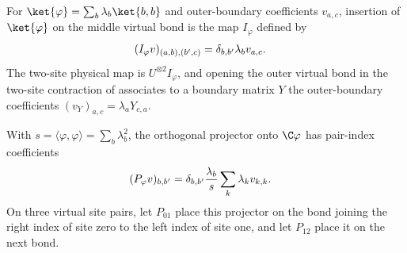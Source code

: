 \begin{definition}
    \label{def:appendixB_two_site_bond_embedding}
    \leanok
    For $\ket{\varphi}=\sum_b\lambda_b\ket{b,b}$ and outer-boundary
    coefficients $v_{a,c}$, insertion of $\ket{\varphi}$ on the middle virtual
    bond is the map $I_\varphi$ defined by
    \begin{align}
        (I_\varphi v)_{(a,b),(b',c)}
         & =
        \delta_{b,b'}\lambda_bv_{a,c}.
        \notag
    \end{align}
    The two-site physical map is $U^{\otimes2}I_\varphi$, and opening the outer
    virtual bond in the two-site contraction of
    \cite[Equations~(3.17)--(3.18)]{Cirac2016MPDO_arXiv} associates to a
    boundary matrix $Y$ the outer-boundary coefficients
    $(v_Y)_{a,c}=\lambda_aY_{c,a}$.
\end{definition}

\begin{definition}
    \label{def:appendixB_virtual_bond_projectors}
    \leanok
    With $s=\langle\varphi,\varphi\rangle=\sum_b\lambda_b^2$,
    the orthogonal projector onto $\C\varphi$ has pair-index coefficients
    \begin{align}
        (P_\varphi v)_{b,b'}
         & =
        \delta_{b,b'}\frac{\lambda_b}{s}
        \sum_k\lambda_kv_{k,k}.
        \notag
    \end{align}
    On three virtual site pairs, let $P_{01}$ place this projector on the bond
    joining the right index of site zero to the left index of site one, and let
    $P_{12}$ place it on the next bond.
\end{definition}

